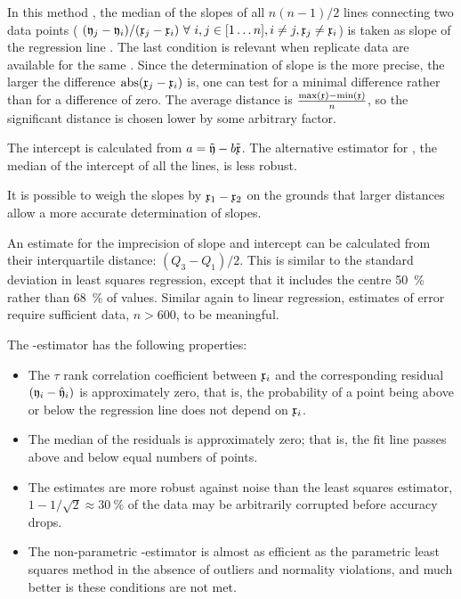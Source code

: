 \begin{refsection}
In this method \parencite{The-50}, the median of the slopes of all \( n(n-1)/2 \) lines connecting two data points ( \( (\mathfrak{y}_j - \mathfrak{y}_i)/(\mathfrak{x}_j - \mathfrak{x}_i)\ \forall\ i,j \in [1\ldots n], i \neq j, \mathfrak{x}_j \neq \mathfrak{x}_i \)) is taken as slope of the regression line . The last condition is relevant when replicate data are available for the same . Since the determination of slope is the more precise, the larger the difference \(\operatorname{abs}(\mathfrak{x}_j - \mathfrak{x}_i) \) is, one can test for a minimal difference rather than for a difference of zero. The average distance is \(\frac{\max(\mathfrak{x}) - \min(\mathfrak{x})}{n} \), so the significant distance is chosen lower by some arbitrary factor.

The intercept is calculated from \(a = \tilde{\mathfrak{y}} - b \tilde{\mathfrak{x}} \). The alternative estimator for , the median of the intercept of all the lines, is less robust.

It is possible to weigh the slopes by \(\mathfrak{x}_1 - \mathfrak{x}_2 \) on the grounds that larger distances allow a more accurate determination of slopes.

An estimate for the imprecision of slope and intercept can be calculated from their interquartile distance: \((Q_3 - Q_1) / 2 \). This is similar to the standard deviation in least squares regression, except that it includes the centre \SI{50}{\%} rather than \SI{68}{\%} of values. Similar again to linear regression, estimates of error require sufficient data, \(n > 600 \), to be meaningful.

The -estimator has the following properties:
\begin{itemize}
  \item{The  \(\tau \) rank correlation coefficient between \(\mathfrak{x}_i \) and the corresponding residual \((\mathfrak{y}_i - \hat{\mathfrak{y}}_i) \) is approximately zero, that is, the probability of a point being above or below the regression line does not depend on \(\mathfrak{x}_i \).}
  \item{The median of the residuals is approximately zero; that is, the fit line passes above and below equal numbers of points. }
  \item{The estimates are more robust against noise than the least squares estimator, \(1 - 1/\sqrt{2} \approx \SI{30}{\%} \) of the data may be arbitrarily corrupted before accuracy drops.}
  \item{The non-parametric -estimator is almost as efficient as the parametric least squares method in the absence of outliers and normality violations, and much better is these conditions are not met.}
\end{itemize}


\end{refsection}
